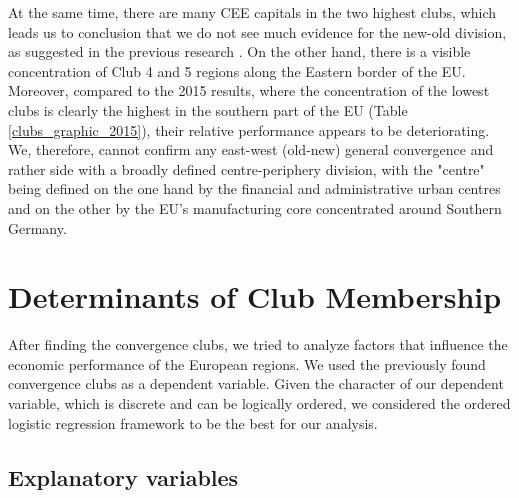 \documentclass[11pt]{article}
\begin{document}
At the same time, there are many CEE capitals in the two highest clubs, which leads us to conclusion that we do not see much evidence for the new-old division, as suggested in the previous research \citep{eckey2007convergence}.
On the other hand, there is a visible concentration of Club 4 and 5 regions along the Eastern border of the EU. Moreover, compared to the 2015 results, where the concentration of the lowest clubs is clearly the highest in the southern part of the EU (Table \ref{clubs_graphic_2015}), their relative performance appears to be deteriorating. We, therefore, cannot confirm any east-west (old-new) general convergence and rather side with a broadly defined centre-periphery division, with the "centre" being defined on the one hand by the financial and administrative urban centres and on the other by the EU's manufacturing core concentrated around Southern Germany.



\section{Determinants of Club Membership}
\label{Determinants of club membership}


 
After finding the convergence clubs, we tried to analyze factors that influence the economic performance of the European regions. We used the previously found convergence clubs as a dependent variable. Given the character of our dependent variable, which is discrete and can be logically ordered, we considered the ordered logistic regression framework to be the best for our analysis.

\subsection{Explanatory variables}
\end{document}

